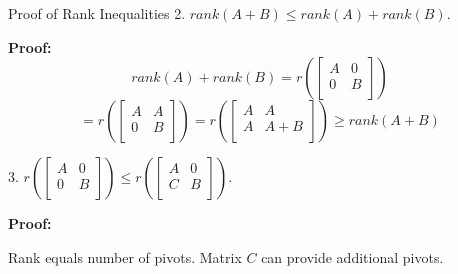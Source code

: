 \documentclass{beamer}
\begin{document}
\begin{frame}{Proof of Rank Inequalities}
2. $rank(A+B)\leqslant rank(A)+rank(B)$.

\vspace{5pt}
\textbf{Proof:}
\begin{equation*}
    rank\left( A \right) +rank\left( B \right) =r\left( \left[ \begin{matrix}
        A&		0\\
        0&		B\\
    \end{matrix} \right] \right)
\end{equation*}
\begin{equation*}
    =r\left( \left[ \begin{matrix}
        A&		A\\
        0&		B\\
    \end{matrix} \right] \right) =r\left( \left[ \begin{matrix}
        A&		A\\
        A&		A+B\\
    \end{matrix} \right] \right) \geqslant rank\left( A+B \right)
\end{equation*}

3. $r\left( \left[ \begin{matrix}
	A&		0\\
	0&		B\\
\end{matrix} \right] \right) \leqslant r\left( \left[ \begin{matrix}
	A&		0\\
	C&		B\\
\end{matrix} \right] \right)$.

\vspace{5pt}
\textbf{Proof:}

\vspace{3pt}
Rank equals number of pivots. Matrix $C$ can provide additional pivots.
\end{frame}
\end{document}
